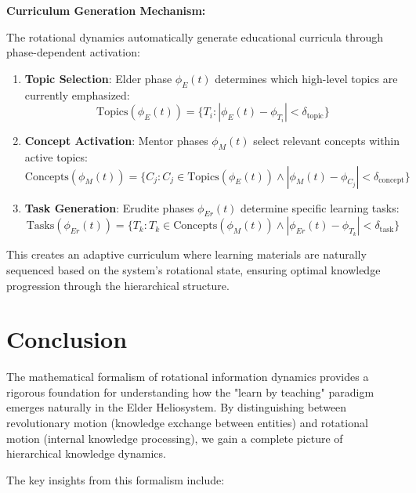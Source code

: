 \textbf{Curriculum Generation Mechanism:}

The rotational dynamics automatically generate educational curricula through phase-dependent activation:

\begin{enumerate}
    \item \textbf{Topic Selection}: Elder phase $\phi_E(t)$ determines which high-level topics are currently emphasized:
    \begin{equation}
    \text{Topics}(\phi_E(t)) = \{T_i : |\phi_E(t) - \phi_{T_i}| < \delta_{\text{topic}}\}
    \end{equation}
    
    \item \textbf{Concept Activation}: Mentor phases $\phi_M(t)$ select relevant concepts within active topics:
    \begin{equation}
    \text{Concepts}(\phi_M(t)) = \{C_j : C_j \in \text{Topics}(\phi_E(t)) \land |\phi_M(t) - \phi_{C_j}| < \delta_{\text{concept}}\}
    \end{equation}
    
    \item \textbf{Task Generation}: Erudite phases $\phi_{Er}(t)$ determine specific learning tasks:
    \begin{equation}
    \text{Tasks}(\phi_{Er}(t)) = \{T_k : T_k \in \text{Concepts}(\phi_M(t)) \land |\phi_{Er}(t) - \phi_{T_k}| < \delta_{\text{task}}\}
    \end{equation}
\end{enumerate}

This creates an adaptive curriculum where learning materials are naturally sequenced based on the system's rotational state, ensuring optimal knowledge progression through the hierarchical structure.

\section{Conclusion}

The mathematical formalism of rotational information dynamics provides a rigorous foundation for understanding how the "learn by teaching" paradigm emerges naturally in the Elder Heliosystem. By distinguishing between revolutionary motion (knowledge exchange between entities) and rotational motion (internal knowledge processing), we gain a complete picture of hierarchical knowledge dynamics.

The key insights from this formalism include:

